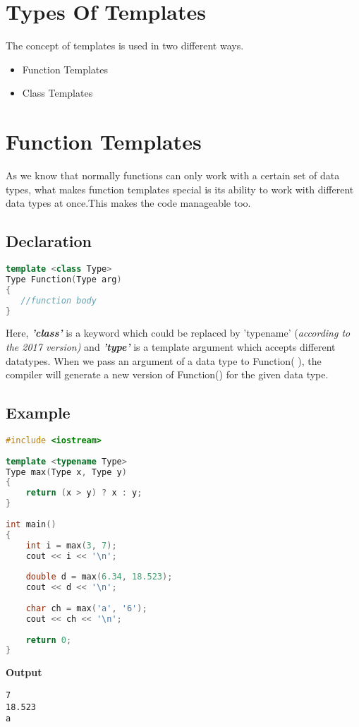 \documentclass[11pt,fleqn]{book} %
\begin{document}
\section{Types Of Templates}

The concept of templates is used in two different ways.\\
\begin{itemize}
\item Function Templates 
\item Class Templates
\end{itemize}

\section{Function Templates}

As we know that normally functions can only work with a certain set of data types, what makes function templates special is its ability to work with different data types at once.This makes the code manageable too.
\newpage
\subsection{Declaration}
\begin{lstlisting}[language=C++, caption= Declaration Of Function Templates]
template <class Type>
Type Function(Type arg)
{
   //function body
}
\end{lstlisting}

Here, \textbf{\textit{'class'}} is a keyword which could be replaced by 'typename' {(\it{according to the 2017 version})} and \textbf{\textit{'type'}} is a template argument which accepts different datatypes. When we pass an argument of a data type to Function( ), the compiler will generate a new version of Function() for the given data type.\\

\subsection{Example}

\begin{lstlisting}[language=C++, caption= Eg:Function Template to output the greater number
]
#include <iostream>
 
template <typename Type>
Type max(Type x, Type y)
{
    return (x > y) ? x : y;
}
 
int main()
{
    int i = max(3, 7);
    cout << i << '\n';
 
    double d = max(6.34, 18.523);
    cout << d << '\n';
 
    char ch = max('a', '6');
    cout << ch << '\n';
 
    return 0;
}
\end{lstlisting}
\textbf{Output}
\begin{lstlisting}
7
18.523
a
\end{lstlisting}
\end{document}
